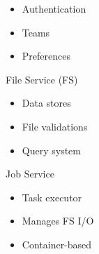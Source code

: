 \documentclass[landscape,paperwidth=70in,paperheight=46in,fontscale=0.225]{baposter} %
\begin{document}
\begin{poster}
{\begin{minipage}[t]{0.32\columnwidth}
\begin{itemize}[leftmargin=*,noitemsep,topsep=0pt]
	\item Authentication
	\item Teams
	\item Preferences
\end{itemize}
\end{minipage}
\hfill
\noindent
\begin{minipage}[t]{0.32\columnwidth}
File Service (FS)

\begin{itemize}[leftmargin=*,noitemsep,topsep=0pt]
	\item Data stores
	\item File validations
	\item Query system
\end{itemize}

\end{minipage}
\hfill
\noindent
\begin{minipage}[t]{0.32\columnwidth}
Job Service
\begin{itemize}[leftmargin=*,noitemsep,topsep=0pt]
	\item Task executor
	\item Manages FS I/O
	\item Container-based 

\end{itemize}

\end{minipage}
}


%          


\end{poster}
\end{document}
